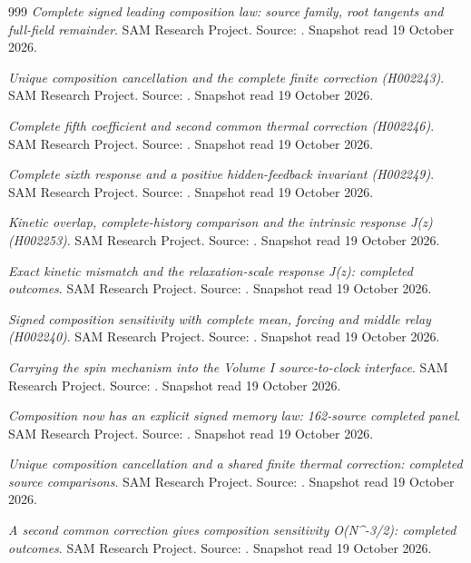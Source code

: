 \begin{thebibliography}{999}
 \emph{Complete signed leading composition law: source family, root tangents and full-field remainder}. SAM Research Project. Source: . Snapshot read 19 October 2026.

 \emph{Unique composition cancellation and the complete finite correction (H002243)}. SAM Research Project. Source: . Snapshot read 19 October 2026.

 \emph{Complete fifth coefficient and second common thermal correction (H002246)}. SAM Research Project. Source: . Snapshot read 19 October 2026.

 \emph{Complete sixth response and a positive hidden-feedback invariant (H002249)}. SAM Research Project. Source: . Snapshot read 19 October 2026.

 \emph{Kinetic overlap, complete-history comparison and the intrinsic response J(z) (H002253)}. SAM Research Project. Source: . Snapshot read 19 October 2026.

 \emph{Exact kinetic mismatch and the relaxation-scale response J(z): completed outcomes}. SAM Research Project. Source: . Snapshot read 19 October 2026.

 \emph{Signed composition sensitivity with complete mean, forcing and middle relay (H002240)}. SAM Research Project. Source: . Snapshot read 19 October 2026.

 \emph{Carrying the spin mechanism into the Volume I source-to-clock interface}. SAM Research Project. Source: . Snapshot read 19 October 2026.

 \emph{Composition now has an explicit signed memory law: 162-source completed panel}. SAM Research Project. Source: . Snapshot read 19 October 2026.

 \emph{Unique composition cancellation and a shared finite thermal correction: completed source comparisons}. SAM Research Project. Source: . Snapshot read 19 October 2026.

 \emph{A second common correction gives composition sensitivity O(N\textasciicircum{}-3/2): completed outcomes}. SAM Research Project. Source: . Snapshot read 19 October 2026.


\end{thebibliography}
